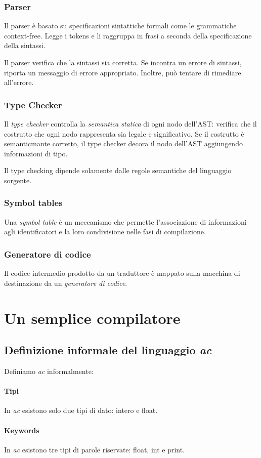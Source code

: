 \documentclass[11pt]{article}
\begin{document}
\subsubsection{Parser}
Il parser è basato su specificazioni sintattiche formali come le grammatiche context-free. Legge i tokens e li raggruppa 
in frasi a seconda della specificazione della sintassi.

Il parser verifica che la sintassi sia corretta. Se incontra un errore di sintassi, riporta un messaggio di errore appropriato.
Inoltre, può tentare di rimediare all'errore.
\subsubsection{Type Checker}
Il \textit{type checker} controlla la \textit{semantica statica} di ogni nodo dell'AST: verifica che il costrutto che ogni 
nodo rappresenta sia legale e significativo. Se il costrutto è semanticmante corretto, il type checker decora il nodo 
dell'AST aggiungendo informazioni di tipo.

Il type checking dipende solamente dalle regole semantiche del linguaggio sorgente.
\subsubsection{Symbol tables}
Una \textit{symbol table} è un meccanismo che permette l'associazione di informazioni agli identificatori e la loro 
condivisione nelle fasi di compilazione.
\subsubsection{Generatore di codice}
Il codice intermedio prodotto da un traduttore è mappato sulla macchina di destinazione da un \textit{generatore di 
codice}.
\section{Un semplice compilatore}
\subsection{Definizione informale del linguaggio \textit{ac}}
Definiamo \textit{ac} informalmente:
\paragraph*{Tipi} In \textit{ac} esistono solo due tipi di dato: intero e float.
\paragraph*{Keywords} In \textit{ac} esistono tre tipi di parole riservate: float, int e print.
\end{document}
